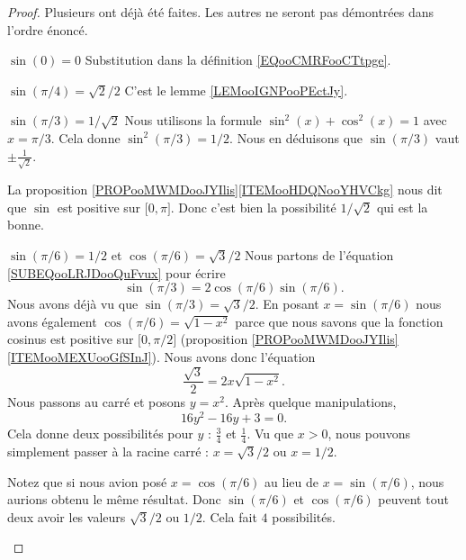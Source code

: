 \begin{proof}
    Plusieurs ont déjà été faites. Les autres ne seront pas démontrées dans l'ordre énoncé.
    \begin{subproof}
        \item[$\sin(0)=0$]
            Substitution dans la définition \eqref{EQooCMRFooCTtpge}.
        \item[$ \sin(\pi/4)=\sqrt{ 2 }/2$] 
            C'est le lemme \ref{LEMooIGNPooPEctJy}.
        \item[$ \sin(\pi/3)=1/\sqrt{ 2 }$] 
            Nous utilisons la formule \( \sin^2(x)+\cos^2(x)=1\) avec \( x=\pi/3\). Cela donne \( \sin^2(\pi/3)=1/2\). Nous en déduisons que \( \sin(\pi/3)\) vaut \( \pm\frac{1}{ \sqrt{ 2 } }\).

            La proposition \ref{PROPooMWMDooJYIlis}\ref{ITEMooHDQNooYHVCkg} nous dit que \( \sin\) est positive sur \(\mathopen[ 0 , \pi \mathclose]\). Donc c'est bien la possibilité \( 1/\sqrt{ 2 }\) qui est la bonne.
        \item[$\sin(\pi/6)=1/2$ et $\cos(\pi/6)=\sqrt{ 3 }/2 $]
            Nous partons de l'équation \eqref{SUBEQooLRJDooQuFvux} pour écrire
            \begin{equation}
                \sin(\pi/3)=2\cos(\pi/6)\sin(\pi/6).
            \end{equation}
            Nous avons déjà vu que \( \sin(\pi/3)=\sqrt{ 3 }/2\). En posant \( x=\sin(\pi/6)\) nous avons également \( \cos(\pi/6)=\sqrt{ 1-x^2 }\) parce que nous savons que la fonction cosinus est positive sur \( \mathopen[ 0 , \pi/2 \mathclose]\) (proposition \ref{PROPooMWMDooJYIlis}\ref{ITEMooMEXUooGfSInJ}). Nous avons donc l'équation
            \begin{equation}
                \frac{ \sqrt{ 3 } }{2}=2x\sqrt{ 1-x^2 }.
            \end{equation}
            Nous passons au carré et posons \( y=x^2\). Après quelque manipulations, 
            \begin{equation}
                16y^2-16y+3=0.
            \end{equation}
            Cela donne deux possibilités pour \( y\) : \( \frac{ 3 }{ 4 }\) et \( \frac{1}{ 4 }\). Vu que \( x>0\), nous pouvons simplement passer à la racine carré : \( x=\sqrt{ 3 }/2\) ou \( x=1/2\).

            Notez que si nous avion posé \( x=\cos(\pi/6)\) au lieu de \( x=\sin(\pi/6)\), nous aurions obtenu le même résultat. Donc \( \sin(\pi/6)\) et \( \cos(\pi/6)\) peuvent tout deux avoir les valeurs \( \sqrt{ 3 }/2\) ou \( 1/2\). Cela fait \( 4\) possibilités.


\end{subproof}
\end{proof}

